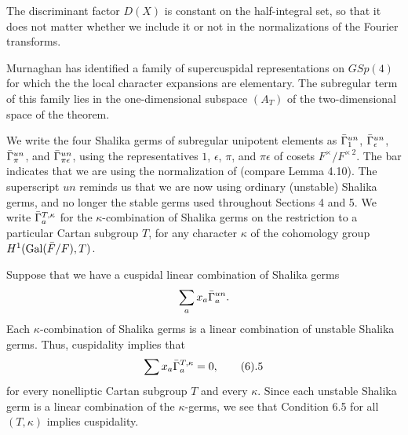 The discriminant factor $D(X)$ is constant on the half-integral
set, so that it does not matter whether we include it or
not in the normalizations of the Fourier transforms. 

 Murnaghan \cite{M1} has identified a family of supercuspidal
representations on $GSp(4)$ for which the the 
local character expansions
are elementary.  The subregular term of this family lies in the
one-dimensional subspace
$(A_T)$ of the two-dimensional space  of the theorem.

  We write the four Shalika germs of subregular
unipotent elements as $\bar\Gamma^{un}_1$, $\bar\Gamma^{un}_\epsilon$, $\bar\Gamma^{un}_\pi$,
and $\bar\Gamma^{un}_{\pi\epsilon}$, using the representatives $1$, $\epsilon$,
$\pi$, and $\pi\epsilon$ of cosets $F^\times/F^{\times\,2}$.  The
bar indicates that we are using the normalization of \cite{H5}
(compare Lemma 4.10).
The superscript $un$ reminds us that we are now using ordinary
(unstable) Shalika germs, and no longer the stable germs used throughout
Sections 4 and 5.  We write $\bar\Gamma^{T,\kappa}_a$ for the $\kappa$-combination
of Shalika germs on the restriction to a particular Cartan subgroup $T$,
for any character $\kappa$ of the cohomology group
$H^1(\operatorname{Gal}({\bar F}/F),T)$.

Suppose that we have a cuspidal linear combination of Shalika germs
$$\sum_a x_a \bar\Gamma^{un}_a.$$
Each $\kappa$-combination of Shalika germs is a linear combination
of unstable Shalika germs.  Thus, cuspidality implies that
$$\sum x_a \bGamma^{T,\kappa}_a = 0,\tag 6.5$$
for every nonelliptic Cartan subgroup $T$ and every $\kappa$.
Since each unstable
Shalika germ is a linear combination of the $\kappa$-germs, we see
that Condition 6.5 for all $(T,\kappa)$ implies cuspidality.

